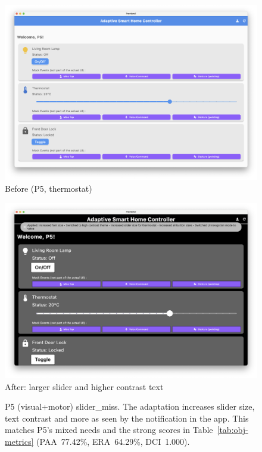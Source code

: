 \begin{figure}[H]
\centering
\begin{minipage}{0.48\textwidth}
  \includegraphics[width=\linewidth]{images/microcase_p5_before.png}\\[-0.5em]
  \centering\small Before (P5, thermostat)
\end{minipage}\hfill
\begin{minipage}{0.48\textwidth}
  \includegraphics[width=\linewidth]{images/microcase_p5_after.png}\\[-0.5em]
  \centering\small After: larger slider and higher contrast text
\end{minipage}
\caption{P5 (visual+motor) slider\_miss. The adaptation increases slider size, text contrast and more as seen by the notification in the app. This matches P5’s mixed needs and the strong scores in Table~\ref{tab:obj-metrics} (PAA~77.42\%, ERA~64.29\%, DCI~1.000).}
\label{fig:micro-p5}
\end{figure}

